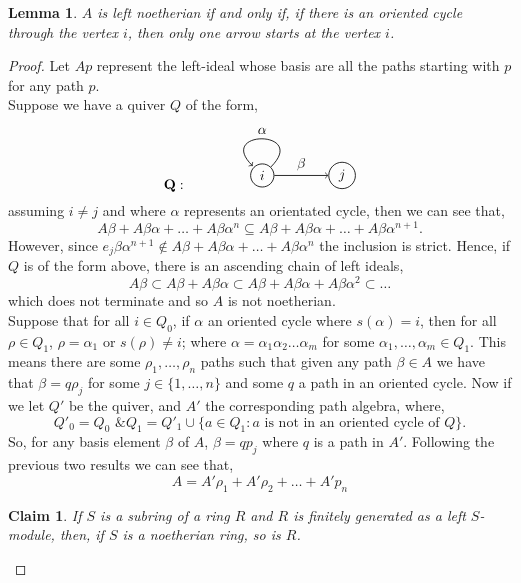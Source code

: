 \documentclass[11.5pt, twoside, a4paper, titlepage]{report}
\providecommand{\equ}[0]{\begin{equation*}}
\providecommand{\eequ}[0] {\end{equation*}}
\theoremstyle{definition}
\theoremstyle{plain}
\newtheorem{lem}[mydef]{Lemma}
\newtheorem*{claim}{Claim}
\begin{document}
\begin{lem}
$A$ is left noetherian if and only if, if there is an oriented cycle through the vertex $i$, then only one arrow starts at the vertex $i$.
\end{lem}
\begin{proof}
Let $Ap$ represent the left-ideal whose basis are all the paths starting with $p$ for any path $p$. \\
Suppose we have a quiver $Q$ of the form,
\equ
\mathbf{Q}: \qquad
\begin{tikzpicture}[->,-latex, auto, every path/.style={->, semithick}, main node/.style={draw, circle}]
\node	[main node]		(1) at (0,0)		{$i$};
\node [main node]		(2) at (2,0)		{$j$};

\draw (1) edge [loop] node [auto, swap] {$\alpha$} (1);
\draw (1) edge node [auto] {$\beta$} (2);
\end{tikzpicture}
\eequ
assuming $i\neq j$ and where $\alpha$ represents an orientated cycle, then we can see that,
\equ
A\beta+A\beta\alpha+\dots +A\beta\alpha^n \subseteq A\beta+A\beta\alpha+\dots +A\beta\alpha^{n+1}.
\eequ
However, since $e_j\beta\alpha^{n+1}\not \in A\beta+A\beta\alpha+\dots +A\beta\alpha^n$ the inclusion is strict. Hence, if $Q$ is of the form above, there is an ascending chain of left ideals, 
\equ
A\beta \subset A\beta + A\beta\alpha \subset A\beta + A\beta\alpha+A\beta\alpha^2 \subset \dots
\eequ
which does not terminate and so $A$ is not noetherian.\\
Suppose that for all $i\in Q_0$, if $\alpha$ an oriented cycle where $s(\alpha)=i$, then for all $\rho \in Q_1$, $\rho=\alpha_1$ or $s(\rho)\neq i$; where $\alpha=\alpha_1\alpha_2\dots\alpha_m$ for some $\alpha_1, \dots, \alpha_m \in Q_1$. This means there are some $\rho_1, \dots, \rho_n$ paths such that given any path $\beta\in A$ we have that $\beta=q\rho_j$ for some $j\in\{1, \dots, n\}$ and some $q$ a path in an oriented cycle.
Now if we let $Q'$ be the quiver, and  $A'$ the corresponding path algebra, where, 
\equ
Q'_0=Q_0\text{ \& } Q_1=Q'_1\cup \{a\in Q_1: a \text{ is not in an oriented cycle of }Q\}.
\eequ
So, for any basis element $\beta$ of $A$, $\beta=qp_j$ where $q$ is a path in $A'$. Following the previous two results we can see that, 
\begin{equation}
A=A'\rho_1+A'\rho_2 + \dots +A'p_n
\end{equation}
\begin{claim}
 If $S$ is a subring of a ring $R$ and $R$ is finitely generated as a left $S$-module, then, if $S$ is a noetherian ring, so is $R$.

\end{claim}
\end{proof}
\end{document}
